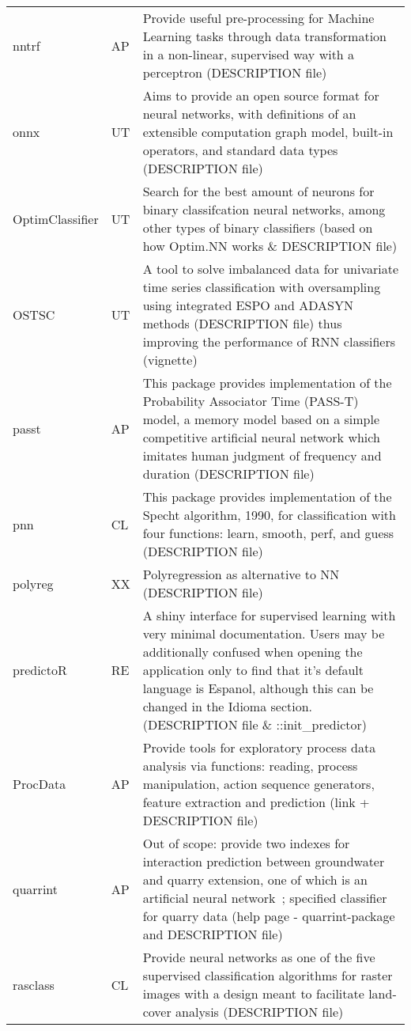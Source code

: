 \begin{Schunk}
\begin{longtable}[t]{ll>{\raggedright\arraybackslash}p{10cm}}
nntrf & AP & Provide useful pre-processing for Machine Learning tasks through data transformation in a non-linear, supervised way with a perceptron (DESCRIPTION file)\\
onnx & UT & Aims to provide an open source format for neural networks, with definitions of an extensible computation graph model, built-in operators, and standard data types (DESCRIPTION file)\\
\addlinespace
OptimClassifier & UT & Search for the best amount of neurons for binary classifcation neural networks, among other types of binary classifiers (based on how Optim.NN works \& DESCRIPTION file)\\
OSTSC & UT & A tool to solve imbalanced data for univariate time series classification with oversampling using integrated ESPO and ADASYN methods (DESCRIPTION file) thus improving the performance of RNN classifiers (vignette)\\
passt & AP & This package provides implementation of the Probability Associator Time (PASS-T) model, a memory model based on a simple competitive artificial neural network which imitates human judgment of frequency and duration (DESCRIPTION file)\\
pnn & CL & This package provides implementation of the Specht algorithm, 1990, for classification with four functions: learn, smooth, perf, and guess (DESCRIPTION file)\\
polyreg & XX & Polyregression as alternative to NN (DESCRIPTION file)\\
\addlinespace
predictoR & RE & A shiny interface for supervised learning with very minimal documentation. Users may be additionally confused when opening the application only to find that it's default language is Espanol, although this can be changed in the Idioma section. (DESCRIPTION file \& ::init\_predictor)\\
ProcData & AP & Provide tools for exploratory process data analysis via functions: reading, process manipulation, action sequence generators, feature extraction and prediction (link + DESCRIPTION file)\\
quarrint & AP & Out of scope: provide two indexes for interaction prediction between groundwater and quarry extension, one of which is an artificial neural network ; specified classifier for quarry data (help page - quarrint-package and DESCRIPTION file)\\
rasclass & CL & Provide neural networks as one of the five supervised classification algorithms for raster images with a design meant to facilitate land-cover analysis (DESCRIPTION file)\\

\end{longtable}
\end{Schunk}
